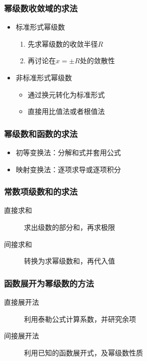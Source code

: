 \documentclass[14pt,notheorems,leqno,xcolor={rgb}]{beamer} %
\begin{document}
\begin{frame}
\frametitle{幂级数收敛域的求法}
\begin{itemize}
  \item 标准形式幂级数
  \begin{enumerate}
    \item 先求幂级数的收敛半径$R$
    \item 再讨论在$x=\pm R$处的敛散性
  \end{enumerate}
  \item 非标准形式幂级数
  \begin{itemize}
    \item 通过换元转化为标准形式
    \item 直接用比值法或者根值法
  \end{itemize}
\end{itemize}
\end{frame}

\begin{frame}
\frametitle{幂级数和函数的求法}
\begin{itemize}
  \item 初等变换法：分解和式并套用公式
  \item 映射变换法：逐项求导或逐项积分
\end{itemize}
\begin{center}
\end{center}
\end{frame}

\begin{frame}
\frametitle{常数项级数和的求法}
\begin{description}
  \item[直接求和] 求出级数的部分和，再求极限
  \item[间接求和] 转换为求幂级数和，再代入值
\end{description}
\end{frame}

\begin{frame}
\frametitle{函数展开为幂级数的方法}
\begin{description}
  \item[直接展开法] 利用泰勒公式计算系数，并研究余项
  \item[间接展开法] 利用已知的函数展开式，及幂级数性质
\end{description}
\end{frame}
\end{document}
